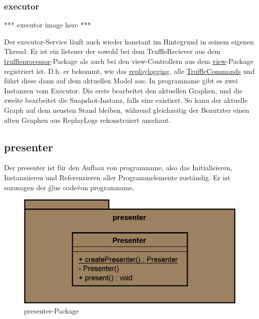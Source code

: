     \subsubsection{executor}
    \label{subsubsec:executor}

    *** executor image here ***
    \newline
    \newline

    Der executor-Service läuft auch wieder konstant im Hintegrund in seinem
    eigenen Thread. Er ist ein \gls{listener} der sowohl bei dem TruffleReciever aus dem
    \hyperref[subsubsec:truffleprocessor]{truffleprocessor}-Package als
    auch bei den view-Controllern aus dem \hyperref[subsec:view]{view}-Package
    registriert ist. D.h. er bekommt, wie das \hyperref[subsubsec:replaylogging]{replaylogging},
    alle \hyperref[subsubsec:trufflecommand]{TruffleCommands} und führt diese
    dann auf dem aktuellen Model aus.
    \newline
    \newline
    In \gls{programname} gibt es zwei Instanzen vom Executor. Die erste bearbeitet
    den aktuellen Graphen, und die zweite bearbeitet die Snapshot-Instanz, falls
    eine existiert. So kann der aktuelle Graph auf dem neusten Stand bleiben, während
    gleichzeitig der Benutzter einen alten Graphen aus
    ReplayLogs rekonstruiert anschaut.


\subsection{presenter}
\label{subsec:presenter}

Der presenter ist für den Aufbau von \gls{programname}, also das
Initialisieren, Instanziieren und Referenzieren aller Programmelemente zuständig.
Er ist sozusagen der \"glue code\" von \gls{programname}.

\begin{figure}[H]
  \centering
  \includegraphics[width=\textwidth]{../diagramimages/presenter.png}
  \caption{presenter-Package}
\end{figure}

